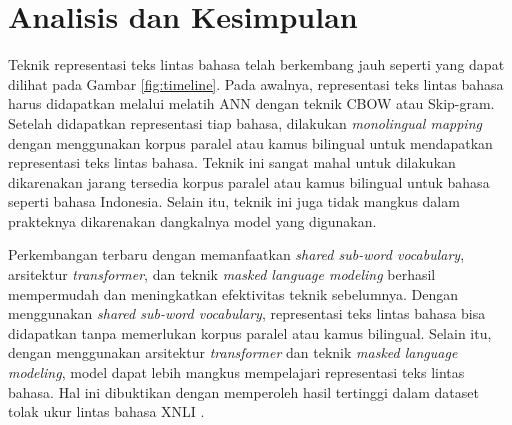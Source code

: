 \documentclass[conference]{IEEEtran}
\begin{document}
\section{Analisis dan Kesimpulan}
Teknik representasi teks lintas bahasa telah berkembang jauh seperti yang dapat dilihat pada Gambar \ref{fig:timeline}. Pada awalnya, representasi teks lintas bahasa harus didapatkan melalui melatih ANN dengan teknik CBOW atau Skip-gram. Setelah didapatkan representasi tiap bahasa, dilakukan \textit{monolingual mapping} dengan menggunakan korpus paralel atau kamus bilingual untuk mendapatkan representasi teks lintas bahasa. Teknik ini sangat mahal untuk dilakukan dikarenakan jarang tersedia korpus paralel atau kamus bilingual untuk bahasa seperti bahasa Indonesia. Selain itu, teknik ini juga tidak mangkus dalam prakteknya dikarenakan dangkalnya model yang digunakan.

Perkembangan terbaru dengan memanfaatkan \textit{shared sub-word vocabulary}, arsitektur \textit{transformer}, dan teknik \textit{masked language modeling} berhasil mempermudah dan meningkatkan efektivitas teknik sebelumnya. Dengan menggunakan \textit{shared sub-word vocabulary}, representasi teks lintas bahasa bisa didapatkan tanpa memerlukan korpus paralel atau kamus bilingual. Selain itu, dengan menggunakan arsitektur \textit{transformer} dan teknik \textit{masked language modeling}, model dapat lebih mangkus mempelajari representasi teks lintas bahasa. Hal ini dibuktikan dengan memperoleh hasil tertinggi dalam dataset tolak ukur lintas bahasa XNLI \cite{b21}.
\end{document}
